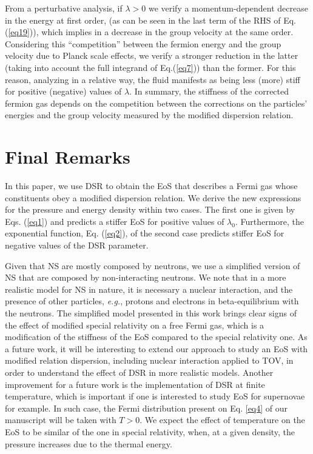 \documentclass[final,5p,times,twocolumn]{elsarticle}
\begin{document}
From a perturbative analysis, if $\lambda>0$ we verify a momentum-dependent decrease in the energy at first order, (as can be seen in the last term of the RHS of Eq.(\ref{eq19})), which implies in a decrease in the group velocity at the same order. Considering this ``competition'' between the fermion energy and the group velocity due to Planck scale effects, we verify a stronger reduction in the latter (taking into account the full integrand of Eq.(\ref{eq7})) than the former. For this reason, analyzing in a relative way, the fluid manifests as being less (more) stiff for positive (negative) values of $\lambda$. In summary, the stiffness of the corrected fermion gas depends on the competition between the corrections on the particles’ energies and the group velocity measured by the modified dispersion relation.




\section{Final Remarks}
\label{conclusion}

In this paper, we use DSR to obtain the EoS that describes a Fermi gas whose constituents obey a modified dispersion relation. We derive the new expressions for the pressure and energy density within two cases.
 The first one is given by Eqs. (\ref{eq1}) and predicts a stiffer EoS for positive values of $\lambda_0$. Furthermore, the exponential function, Eq. (\ref{eq2}), of the second case predicts stiffer EoS for negative values of the DSR parameter.

Given that NS are mostly composed by neutrons, we use a simplified version of NS that are composed by non-interacting neutrons. We note that in a more realistic model for NS in nature, it is necessary a nuclear interaction, and the presence of other particles, {\it e.g.}, protons and electrons in beta-equilibrium with the neutrons.
 The simplified model presented in this work brings clear signs of the effect of modified special relativity on a free Fermi gas, which is a modification of the stiffness of the EoS compared to the special relativity one.  As a future work, it will be interesting to extend our approach to study an EoS with modified relation dispersion, including nuclear interaction applied to TOV, in order to understand the effect of DSR in more realistic models. Another improvement for a future work is the implementation of DSR at finite temperature, which is important if one is interested to study EoS for supernovae for example. In such case, the Fermi distribution present on Eq. \eqref{eq4} of our manuscript will be taken with $T > 0$.  We expect the effect of temperature on the EoS to be similar of the one in special relativity, when, at a given density, the pressure increases due to the thermal energy.
\end{document}
